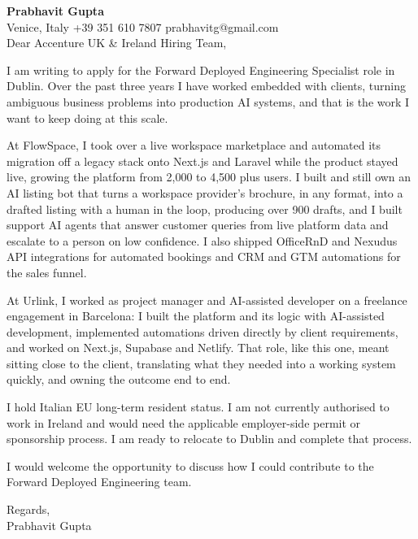 \documentclass[a4paper,10.5pt]{article}
\begin{document}
\textbf{Prabhavit Gupta}\\
Venice, Italy \textbar{} +39 351 610 7807 \textbar{} prabhavitg@gmail.com\\[10pt]
Dear Accenture UK \& Ireland Hiring Team,

I am writing to apply for the Forward Deployed Engineering Specialist role in Dublin. Over the past three years I have worked embedded with clients, turning ambiguous business problems into production AI systems, and that is the work I want to keep doing at this scale.

At FlowSpace, I took over a live workspace marketplace and automated its migration off a legacy stack onto Next.js and Laravel while the product stayed live, growing the platform from 2,000 to 4,500 plus users. I built and still own an AI listing bot that turns a workspace provider's brochure, in any format, into a drafted listing with a human in the loop, producing over 900 drafts, and I built support AI agents that answer customer queries from live platform data and escalate to a person on low confidence. I also shipped OfficeRnD and Nexudus API integrations for automated bookings and CRM and GTM automations for the sales funnel.

At Urlink, I worked as project manager and AI-assisted developer on a freelance engagement in Barcelona: I built the platform and its logic with AI-assisted development, implemented automations driven directly by client requirements, and worked on Next.js, Supabase and Netlify. That role, like this one, meant sitting close to the client, translating what they needed into a working system quickly, and owning the outcome end to end.

I hold Italian EU long-term resident status. I am not currently authorised to work in Ireland and would need the applicable employer-side permit or sponsorship process. I am ready to relocate to Dublin and complete that process.

I would welcome the opportunity to discuss how I could contribute to the Forward Deployed Engineering team.

Regards,\\
Prabhavit Gupta
\end{document}
